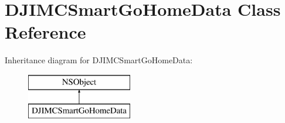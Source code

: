 \hypertarget{interface_d_j_i_m_c_smart_go_home_data}{\section{D\+J\+I\+M\+C\+Smart\+Go\+Home\+Data Class Reference}
\label{interface_d_j_i_m_c_smart_go_home_data}
}
Inheritance diagram for D\+J\+I\+M\+C\+Smart\+Go\+Home\+Data\+:\begin{figure}[H]
\begin{center}
\leavevmode
\includegraphics[height=2.000000cm]{interface_d_j_i_m_c_smart_go_home_data}
\end{center}
\end{figure}
